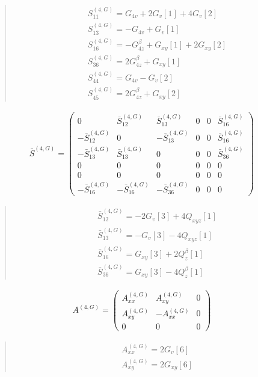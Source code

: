 \documentclass[fleqn,10pt]{jsarticle}
\begin{document}
\begin{quote}
\begin{align*}
& S^{(4,G)}_{11} = G_{4v} + 2 G_{v}[1] + 4 G_{v}[2] \\
& S^{(4,G)}_{13} = - G_{4v} + G_{v}[1] \\
& S^{(4,G)}_{16} = - G_{4z}^{\beta} + G_{xy}[1] + 2 G_{xy}[2] \\
& S^{(4,G)}_{36} = 2 G_{4z}^{\beta} + G_{xy}[1] \\
& S^{(4,G)}_{44} = G_{4v} - G_{v}[2] \\
& S^{(4,G)}_{45} = 2 G_{4z}^{\beta} + G_{xy}[2]
\end{align*}
\end{quote}
\begin{align*}
\bar{S}^{(4,G)} = \begin{pmatrix} 0 & \bar{S}^{(4,G)}_{12} & \bar{S}^{(4,G)}_{13} & 0 & 0 & \bar{S}^{(4,G)}_{16} \\ - \bar{S}^{(4,G)}_{12} & 0 & - \bar{S}^{(4,G)}_{13} & 0 & 0 & \bar{S}^{(4,G)}_{16} \\ - \bar{S}^{(4,G)}_{13} & \bar{S}^{(4,G)}_{13} & 0 & 0 & 0 & \bar{S}^{(4,G)}_{36} \\ 0 & 0 & 0 & 0 & 0 & 0 \\ 0 & 0 & 0 & 0 & 0 & 0 \\ - \bar{S}^{(4,G)}_{16} & - \bar{S}^{(4,G)}_{16} & - \bar{S}^{(4,G)}_{36} & 0 & 0 & 0 \end{pmatrix}
\end{align*}
\begin{quote}
\begin{align*}
& \bar{S}^{(4,G)}_{12} = - 2 G_{v}[3] + 4 Q_{xyz}[1] \\
& \bar{S}^{(4,G)}_{13} = - G_{v}[3] - 4 Q_{xyz}[1] \\
& \bar{S}^{(4,G)}_{16} = G_{xy}[3] + 2 Q_{z}^{\beta}[1] \\
& \bar{S}^{(4,G)}_{36} = G_{xy}[3] - 4 Q_{z}^{\beta}[1]
\end{align*}
\end{quote}
\begin{align*}
A^{(4,G)} = \begin{pmatrix} A^{(4,G)}_{xx} & A^{(4,G)}_{xy} & 0 \\ A^{(4,G)}_{xy} & - A^{(4,G)}_{xx} & 0 \\ 0 & 0 & 0 \end{pmatrix}
\end{align*}
\begin{quote}
\begin{align*}
& A^{(4,G)}_{xx} = 2 G_{v}[6] \\
& A^{(4,G)}_{xy} = 2 G_{xy}[6]
\end{align*}
\end{quote}
\end{document}
